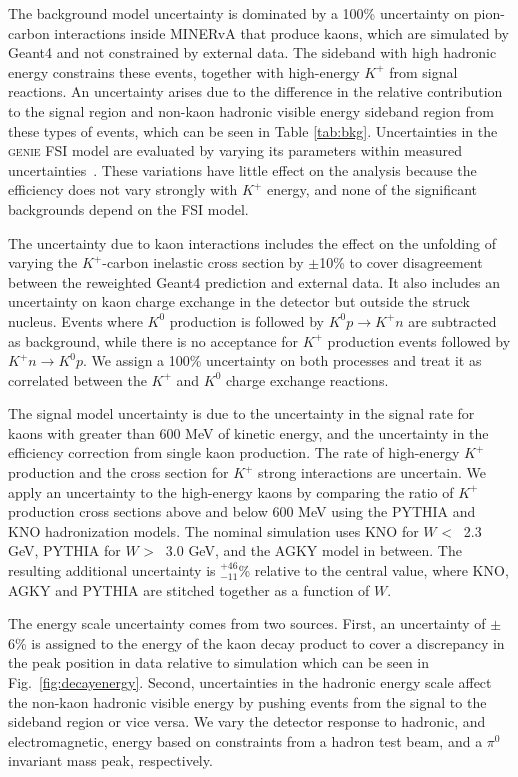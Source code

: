 \documentclass[aps,prl,preprint,showpacs,superscriptaddress,nofootinbib,floatfix,linenumbers]{revtex4}
\newcommand{\genie}{\textsc{genie}\xspace}
\newcommand{\piz}{\ensuremath{\pi^{0}}\xspace}
\newcommand{\kp}{\ensuremath{K^{+}}\xspace}
\newcommand{\kz}{\ensuremath{K^{0}}\xspace}
\begin{document}
The background model uncertainty is dominated by a 100\% uncertainty on pion-carbon interactions inside MINERvA that produce kaons, which are simulated by Geant4 and not constrained by external data. The sideband with high hadronic energy constrains these events, together with high-energy \kp from signal reactions. An uncertainty arises due to the difference in the relative contribution to the signal region and non-kaon hadronic visible energy sideband region from these types of events, which can be seen in Table \ref{tab:bkg}. Uncertainties in the \genie FSI model are evaluated by varying its parameters within measured uncertainties~\cite{genievar1, genievar2}. These variations have little effect on the analysis because the efficiency does not vary strongly with \kp energy, and none of the significant backgrounds depend on the FSI model.

The uncertainty due to kaon interactions includes the effect on the unfolding of varying the \kp-carbon inelastic cross section by $\pm$10\% to cover disagreement between the reweighted Geant4 prediction and external data. It also includes an uncertainty on kaon charge exchange in the detector but outside the struck nucleus. Events where \kz production is followed by $K^{0} p \rightarrow K^{+} n$ are subtracted as background, while there is no acceptance for \kp production events followed by $K^{+} n \rightarrow K^{0} p$. We assign a 100\% uncertainty on both processes and treat it as correlated between the \kp and \kz charge exchange reactions.

The signal model uncertainty is due to the uncertainty in the signal rate for kaons with greater than 600 MeV of kinetic energy, and the uncertainty in the efficiency correction from single kaon production. The rate of high-energy \kp production and the cross section for \kp strong interactions are uncertain. We apply an uncertainty to the high-energy kaons by comparing the ratio of \kp production cross sections above and below 600 MeV using the PYTHIA and KNO hadronization models. The nominal simulation uses KNO for $W$ \textless~ 2.3 GeV, PYTHIA for $W$ \textgreater~ 3.0 GeV, and the AGKY model in between. The resulting additional uncertainty is $_{-11}^{+46}$\% relative to the central value, where KNO, AGKY and PYTHIA are stitched together as a function of $W$.

The energy scale uncertainty comes from two sources. First, an uncertainty of $\pm$6\% is assigned to the energy of the kaon decay product to cover a discrepancy in the peak position in data relative to simulation which can be seen in Fig.~\ref{fig:decayenergy}. Second, uncertainties in the hadronic energy scale affect the non-kaon hadronic visible energy by pushing events from the signal to the sideband region or vice versa. We vary the detector response to hadronic, and electromagnetic, energy based on constraints from a hadron test beam, and a \piz invariant mass peak, respectively. 
\end{document}
